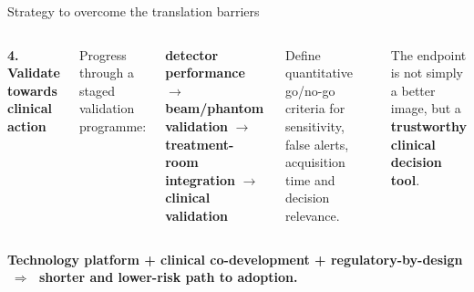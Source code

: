 \documentclass[aspectratio=169,11pt]{beamer}
\begin{document}
\begin{frame}{Strategy to overcome the translation barriers}
\begin{columns}[T,onlytextwidth]
{\begin{minipage}[t][2.55cm][t]{0.94\linewidth}
{\scriptsize\bfseries\color{PTblue}
4. Validate towards clinical action
}

\vspace{0.10cm}

{\tiny
Progress through a staged validation programme:

\vspace{0.06cm}

\textbf{detector performance}
$\rightarrow$
\textbf{beam/phantom validation}
$\rightarrow$
\textbf{treatment-room integration}
$\rightarrow$
\textbf{clinical validation}

\vspace{0.10cm}

Define quantitative go/no-go criteria for sensitivity,
false alerts, acquisition time and decision relevance.

\vspace{0.10cm}

The endpoint is not simply a better image, but a
\textbf{trustworthy clinical decision tool}.
}

\end{minipage}
}

\end{columns}

\vspace{0.30cm}

\begin{center}
{\small\bfseries\color{darkred}
Technology platform + clinical co-development + regulatory-by-design
$\;\Rightarrow\;$ shorter and lower-risk path to adoption.
}
\end{center}

\end{frame}
\end{document}
